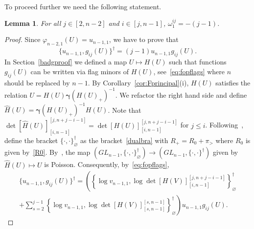 \documentclass{amsart}
\newtheorem{lemma}[theorem]{Lemma}
\theoremstyle{definition}
\theoremstyle{remark}
\numberwithin{equation}{section}
\numberwithin{theorem}{section}
\def\bgamma{\pmb\gamma}
\def\fy{\varphi}
\def\Poi{{\{{\cdot},{\cdot}\}}}
\begin{document}
To proceed further we need the following statement.

\begin{lemma}\label{omega1}
For all $j\in[2,n-2]$ and $i\in[j,n-1]$, $\omega_1^{ij}=-(j-1)$.
\end{lemma}

\begin{proof}
Since $\fy_{n-2,1}(U)=u_{n-1,1}$, we have to prove that 
\begin{equation}\label{eq:omega1}
\{u_{n-1,1},g_{ij}(U)\}^\dag=(j-1)u_{n-1,1}g_{ij}(U). 
\end{equation}
In Section~\ref{badgproof} we defined a map $U\mapsto H(U)$ such that functions $g_{ij}(U)$ can be written via flag minors of $H(U)$, see~\eqref{eq:fopflags} where $n$ should be replaced by $n-1$.  By Corollary~\ref{cor:Fprincipal}(i), 
$H(U)$ satisfies the relation $U=H(U)\bgamma(H(U)_+)^{-1}$. We refactor the right hand side and define $\widehat{H}(U)=
\bgamma(H(U)_+)^{-1}H(U)$. Note that $\det [\widehat{H}(U)]_{[i,n-1]}^{[j,n+j-i-1]}=\det[H(U)]_{[i,n-1]}^{[j,n+j-i-1]}$ 
for $j\le i$. Following~\cite{GSVuni}, define the bracket $\Poi_{\varnothing}^\dag$ as the 
bracket~\eqref{dualbra} with $R_+=R_0+\pi_>$ where $R_0$ is given by~\eqref{R0}. By~\cite[Proposition 3.15]{GV}, the map
$(GL_{n-1},\Poi_{\varnothing}^\dag)\to(GL_{n-1},\Poi^\dag)$ given by $\widehat{H}(U)\mapsto U$ is Poisson. Consequently,
by~\eqref{eq:fopflags},
\begin{multline}\label{briq}
\{u_{n-1,1},g_{ij}(U)\}^\dag=\left(\left\{\log v_{n-1,1}, \log\det[H(V)]_{[i,n-1]}^{[j,n+j-i-1]}\right\}_\varnothing^\dag\right.\\
+\left.\sum_{s=2}^{j-1}\left\{\log v_{n-1,1}, \log\det[H(V)]_{[s,n-1]}^{[s,n-1]}\right\}_\varnothing^\dag\right)
u_{n-1,1}g_{ij}(U).
\end{multline}


\end{proof}
\end{document}
